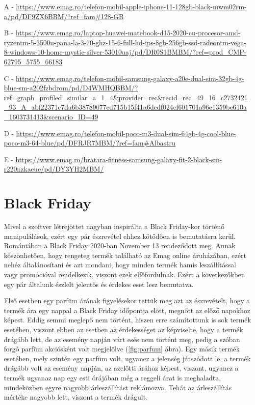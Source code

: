 A - \url{https://www.emag.ro/telefon-mobil-apple-iphone-11-128gb-black-mwm02rm-a/pd/DF9ZX6BBM/?ref=fam\#128-GB}

B - \url{https://www.emag.ro/laptop-huawei-matebook-d15-2020-cu-procesor-amd-ryzentm-5-3500u-pana-la-3-70-ghz-15-6-full-hd-ips-8gb-256gb-ssd-radeontm-vega-8-windows-10-home-mystic-silver-53010uaj/pd/DR0S1BMBM/?ref=prod_CMP-62795_5755_66183}

C - \url{https://www.emag.ro/telefon-mobil-samsung-galaxy-a20e-dual-sim-32gb-4g-blue-sm-a202fzbdrom/pd/D4WMHQBBM/?ref=graph_profiled_similar_a_1_4&provider=rec&recid=rec_49_16_c2732421_93_A_abf22371c7da6b38789077ed715b15f41a6dcdf024ef601701a96e1359be610a_1603731413&scenario_ID=49}

D - \url{https://www.emag.ro/telefon-mobil-poco-m3-dual-sim-64gb-4g-cool-blue-poco-m3-64-blue/pd/DFRJR7MBM/?ref=fam\#Albastru}

E - \url{https://www.emag.ro/bratara-fitness-samsung-galaxy-fit-2-black-sm-r220nzkaeue/pd/DY3YH2MBM/}

\section{Black Friday}

Mivel a szoftver létrejöttet nagyban inspirálta a Black Friday-kor történő manipulálások, ezért egy pár észrevétel ehhez kötődően is bemutatásra kerül. Romániában a Black Friday 2020-ban November 13 rendeződött meg. Annak köszönhetően, hogy rengeteg termék található az Emag online áruházában, ezért nehéz általánosítani és azt mondani, hogy minden termék hamis leszállítással vagy promócióval rendelkezik, viszont ezek elfőfordulnak. Ezért a következőkben egy pár általunk észlelt jelentős és érdekes eset lesz bemutatva.

Első esetben egy parfüm árának figyelésekor tettük meg azt az észrevételt, hogy a termék ára egy nappal a Black Friday időpontja elött, megnőtt az előző napokhoz képest. Eddig semmi meglepő nem történt, hiszen erre számítottunk is sok termék esetében, viszont ebben az esetben az érdekességet az képviselte, hogy a termék drágább lett, de az esemény napján várt esés nem történt meg, pedig a szóban forgó parfüm akciósként volt megjelölve (\ref{fig:parfum} ábra). Egy másik termék esetében, mely szintén egy parfüm volt, ugyanez a jelenség játszódott le, a termék drágább volt az esemény napján, az azelőtti árához képest, viszont, ugyanez a termék ugyanaz nap egy esti órájában még a reggeli árat is meghaladta, mindeközben egyre nagyobb árleszállítást reklámozva. Tehát az árleszállítás mértéke nagyobb lett, viszont a termék drágult.

